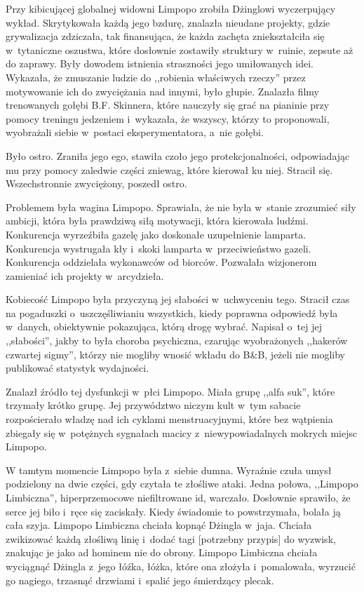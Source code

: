 \documentclass[oneside,polish,11pt,sfheadings]{mwbk}
\begin{document}
Przy kibicującej globalnej widowni Limpopo zrobiła Dżinglowi
wyczerpujący wykład. Skrytykowała każdą jego bzdurę, znalazła nieudane
projekty, gdzie grywalizacja zdziczała, tak finansująca, że każda
zachęta zniekształciła się w~tytaniczne oszustwa, które dosłownie
zostawiły struktury w~ruinie, zepsute aż do zaprawy. Były dowodem
istnienia straszności jego umiłowanych idei. Wykazała, że zmuszanie
ludzie do ,,robienia właściwych rzeczy'' przez motywowanie ich do
zwyciężania nad innymi, było głupie. Znalazła filmy trenowanych gołębi
B.F. Skinnera, które nauczyły się grać na pianinie przy pomocy treningu
jedzeniem i~wykazała, że wszyscy, którzy to proponowali, wyobrażali
siebie w~postaci eksperymentatora, a~nie gołębi.

Było ostro. Zraniła jego ego, stawiła czoło jego protekcjonalności,
odpowiadając mu przy pomocy zaledwie części zniewag, które kierował ku
niej. Stracił się. Wszechstronnie zwyciężony, poszedł ostro.

Problemem była wagina Limpopo. Sprawiała, że nie była w~stanie zrozumieć
siły ambicji, która była prawdziwą siłą motywacji, która kierowała
ludźmi. Konkurencja wyrzeźbiła gazelę jako doskonałe uzupełnienie
lamparta. Konkurencja wystrugała kły i~skoki lamparta w~przeciwieństwo
gazeli. Konkurencja oddzielała wykonawców od biorców. Pozwalała
wizjonerom zamieniać ich projekty w~arcydzieła.

Kobiecość Limpopo była przyczyną jej słabości w~uchwyceniu tego.
Stracił czas na pogaduszki o~uszczęśliwianiu wszystkich, kiedy poprawna
odpowiedź była w~danych, obiektywnie pokazująca, którą drogę wybrać.
Napisał o~tej jej ,,słabości'', jakby to była choroba psychiczna,
czarując wyobrażonych ,,hakerów czwartej sigmy'', którzy nie mogliby
wnosić wkładu do B\&B, jeżeli nie mogliby publikować statystyk
wydajności.

Znalazł źródło tej dysfunkcji w~płci Limpopo. Miała grupę ,,alfa suk'',
które trzymały krótko grupę. Jej przywództwo niczym kult w~tym sabacie
rozpościerało władzę nad ich cyklami menstruacyjnymi, które bez
wątpienia zbiegały się w~potężnych sygnałach macicy z~niewypowiadalnych
mokrych miejsc Limpopo.

W tamtym momencie Limpopo była z~siebie dumna. Wyraźnie czuła umysł
podzielony na dwie części, gdy czytała te złośliwe ataki. Jedna połowa,
,,Limpopo Limbiczna'', hiperprzemocowe niefiltrowane id, warczało.
Dosłownie sprawiło, że serce jej biło i~ręce się zaciskały. Kiedy
świadomie to powstrzymała, bolała ją cała szyja. Limpopo Limbiczna
chciała kopnąć Dżingla w~jaja. Chciała zwikizować każdą złośliwą linię i~dodać tagi {[}potrzebny przypis{]} do wyzwisk, znakując je jako ad
hominem nie do obrony. Limpopo Limbiczna chciała wyciągnąć Dżingla z~jego łóźka, łóżka, które ona złożyła i~pomalowała, wyrzucić go nagiego,
trzasnąć drzwiami i~spalić jego śmierdzący plecak.
\end{document}
